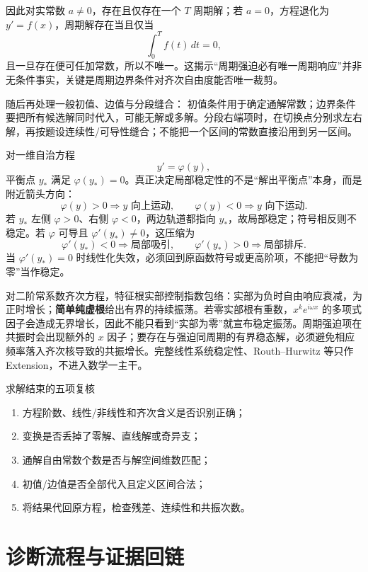 \documentclass[11pt,a4paper,fontset=fandol]{ctexart}
\begin{document}
因此对实常数 $a\ne0$，存在且仅存在一个 $T$ 周期解；若 $a=0$，方程退化为 $y'=f(x)$，周期解存在当且仅当
\[
\int_0^T f(t)\,dt=0,
\]
且一旦存在便可任加常数，所以不唯一。这揭示“周期强迫必有唯一周期响应”并非无条件事实，关键是周期边界条件对齐次自由度能否唯一裁剪。

随后再处理一般初值、边值与分段缝合：
初值条件用于确定通解常数；边界条件要把所有候选解同时代入，可能无解或多解。分段右端项时，在切换点分别求左右解，再按题设连续性/可导性缝合；不能把一个区间的常数直接沿用到另一区间。

对一维自治方程
\[
y'=\varphi(y),
\]
平衡点 $y_*$ 满足 $\varphi(y_*)=0$。真正决定局部稳定性的不是“解出平衡点”本身，而是附近箭头方向：
\[
\varphi(y)>0\Rightarrow y\text{ 向上运动},
\qquad
\varphi(y)<0\Rightarrow y\text{ 向下运动}.
\]
若 $y_*$ 左侧 $\varphi>0$、右侧 $\varphi<0$，两边轨道都指向 $y_*$，故局部稳定；符号相反则不稳定。若 $\varphi$ 可导且 $\varphi'(y_*)\ne0$，这压缩为
\[
\varphi'(y_*)<0\Rightarrow\text{局部吸引},
\qquad
\varphi'(y_*)>0\Rightarrow\text{局部排斥}.
\]
当 $\varphi'(y_*)=0$ 时线性化失效，必须回到原函数符号或更高阶项，不能把“导数为零”当作稳定。

对二阶常系数齐次方程，特征根实部控制指数包络：实部为负时自由响应衰减，为正时增长；\textbf{简单纯虚根}给出有界的持续振荡。若零实部根有重数，$x^k e^{i\omega x}$ 的多项式因子会造成无界增长，因此不能只看到“实部为零”就宣布稳定振荡。周期强迫项在共振时会出现额外的 $x$ 因子；要存在与强迫同周期的有界稳态解，必须避免相应频率落入齐次核导致的共振增长。完整线性系统稳定性、Routh--Hurwitz 等只作 Extension，不进入数学一主干。

\begin{corebox}{求解结束的五项复核}
\begin{enumerate}
  \item 方程阶数、线性/非线性和齐次含义是否识别正确；
  \item 变换是否丢掉了零解、直线解或奇异支；
  \item 通解自由常数个数是否与解空间维数匹配；
  \item 初值/边值是否全部代入且定义区间合法；
  \item 将结果代回原方程，检查残差、连续性和共振次数。
\end{enumerate}
\end{corebox}

\section{诊断流程与证据回链}
\begin{center}
\end{center}
\end{document}
